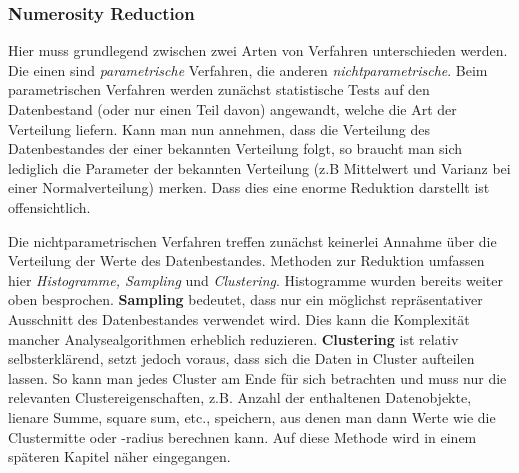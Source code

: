 \subsubsection{Numerosity Reduction}
Hier muss grundlegend zwischen zwei Arten von Verfahren unterschieden werden. Die
einen sind \textit{parametrische} Verfahren, die anderen \textit{nichtparametrische}.
Beim parametrischen Verfahren werden zunächst statistische Tests auf den Datenbestand
(oder nur einen Teil davon) angewandt, welche die Art der Verteilung liefern. Kann
man nun annehmen, dass die Verteilung des Datenbestandes der einer bekannten Verteilung
folgt, so braucht man sich lediglich die Parameter der bekannten Verteilung (z.B 
Mittelwert und Varianz bei einer Normalverteilung) merken. Dass dies eine enorme
Reduktion darstellt ist offensichtlich.

Die nichtparametrischen Verfahren treffen zunächst keinerlei Annahme über die
Verteilung der Werte des Datenbestandes. Methoden zur Reduktion umfassen hier
\textit{Histogramme, Sampling} und \textit{Clustering}. Histogramme wurden bereits
weiter oben besprochen. \textbf{Sampling} bedeutet, dass nur ein möglichst 
repräsentativer Ausschnitt des Datenbestandes verwendet wird. Dies kann die 
Komplexität mancher Analysealgorithmen erheblich reduzieren. \textbf{Clustering}
ist relativ selbsterklärend, setzt jedoch voraus, dass sich die Daten in Cluster
aufteilen lassen. So kann man jedes Cluster am Ende für sich betrachten und muss
nur die relevanten Clustereigenschaften, z.B. Anzahl der enthaltenen Datenobjekte,
lienare Summe, square sum, etc., speichern, aus denen man dann Werte wie die
Clustermitte oder -radius berechnen kann. Auf diese Methode wird in einem späteren
Kapitel näher eingegangen.

